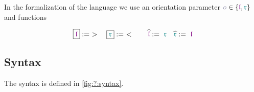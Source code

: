 
In the formalization of the language we use an orientation parameter $\pol \in \{ \polprd,\polcon \}$ and functions

\begin{align*}
  \boxed{\polprd}
  :=\ >
  \quad
  \boxed{\polcon}
  :=\ <
  \qquad
  \widehat{\polprd}
  :=\ \polcon
  \quad
  \widehat{\polcon}
  :=\ \polprd
\end{align*}

\subsection{Syntax}

The syntax is defined in \cref{fig:?:syntax}.

